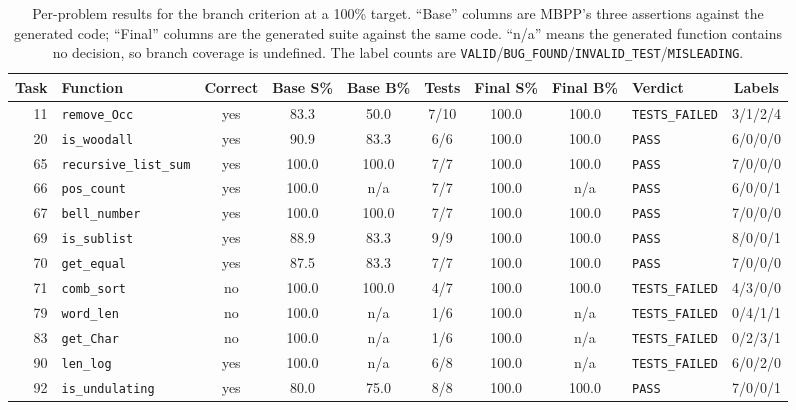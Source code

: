 \documentclass[11pt,a4paper]{article}
\begin{document}
\begin{table}[htbp]
\centering
\footnotesize
\caption{Per-problem results for the branch criterion at a 100\% target. ``Base'' columns are MBPP's three
assertions against the generated code; ``Final'' columns are the generated suite against the same code.
``n/a'' means the generated function contains no decision, so branch coverage is undefined. The label counts
are \texttt{VALID}/\texttt{BUG\_FOUND}/\texttt{INVALID\_TEST}/\texttt{MISLEADING}.}
\label{tab:main}
\begin{tabular}{@{}rlccccccl c@{}}
\toprule
\textbf{Task} & \textbf{Function} & \textbf{Correct} & \textbf{Base S\%} & \textbf{Base B\%} &
\textbf{Tests} & \textbf{Final S\%} & \textbf{Final B\%} & \textbf{Verdict} & \textbf{Labels} \\
\midrule
11 & \texttt{remove\_Occ} & yes & 83.3 & 50.0 & 7/10 & 100.0 & 100.0 & \texttt{TESTS\_FAILED} & 3/1/2/4 \\
20 & \texttt{is\_woodall} & yes & 90.9 & 83.3 & 6/6 & 100.0 & 100.0 & \texttt{PASS} & 6/0/0/0 \\
65 & \texttt{recursive\_list\_sum} & yes & 100.0 & 100.0 & 7/7 & 100.0 & 100.0 & \texttt{PASS} & 7/0/0/0 \\
66 & \texttt{pos\_count} & yes & 100.0 & n/a & 7/7 & 100.0 & n/a & \texttt{PASS} & 6/0/0/1 \\
67 & \texttt{bell\_number} & yes & 100.0 & 100.0 & 7/7 & 100.0 & 100.0 & \texttt{PASS} & 7/0/0/0 \\
69 & \texttt{is\_sublist} & yes & 88.9 & 83.3 & 9/9 & 100.0 & 100.0 & \texttt{PASS} & 8/0/0/1 \\
70 & \texttt{get\_equal} & yes & 87.5 & 83.3 & 7/7 & 100.0 & 100.0 & \texttt{PASS} & 7/0/0/0 \\
71 & \texttt{comb\_sort} & no & 100.0 & 100.0 & 4/7 & 100.0 & 100.0 & \texttt{TESTS\_FAILED} & 4/3/0/0 \\
79 & \texttt{word\_len} & no & 100.0 & n/a & 1/6 & 100.0 & n/a & \texttt{TESTS\_FAILED} & 0/4/1/1 \\
83 & \texttt{get\_Char} & no & 100.0 & n/a & 1/6 & 100.0 & n/a & \texttt{TESTS\_FAILED} & 0/2/3/1 \\
90 & \texttt{len\_log} & yes & 100.0 & n/a & 6/8 & 100.0 & n/a & \texttt{TESTS\_FAILED} & 6/0/2/0 \\
92 & \texttt{is\_undulating} & yes & 80.0 & 75.0 & 8/8 & 100.0 & 100.0 & \texttt{PASS} & 7/0/0/1 \\
\bottomrule
\end{tabular}
\end{table}
\end{document}
